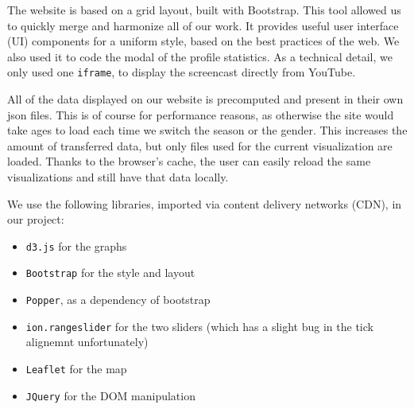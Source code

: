 The website is based on a grid layout, built with Bootstrap.
This tool allowed us to quickly merge and harmonize all of our work.
It provides useful user interface (UI) components for a uniform style, based on the best practices of the web.
We also used it to code the modal of the profile statistics.
As a technical detail, we only used one \texttt{iframe}, to display the screencast directly from YouTube.

All of the data displayed on our website is precomputed and present in their own json files.
This is of course for performance reasons, as otherwise the site would take ages to load each time we switch the season or the gender.
This increases the amount of transferred data, but only files used for the current visualization are loaded.
Thanks to the browser's cache, the user can easily reload the same visualizations and still have that data locally.

We use the following libraries, imported via content delivery networks (CDN), in our project:

\begin{itemize}
    \item \texttt{d3.js} for the graphs
    \item \texttt{Bootstrap} for the style and layout
    \item \texttt{Popper}, as a dependency of bootstrap
    \item \texttt{ion.rangeslider} for the two sliders (which has a slight bug in the tick alignemnt unfortunately)
    \item \texttt{Leaflet} for the map
    \item \texttt{JQuery} for the DOM manipulation
\end{itemize}
